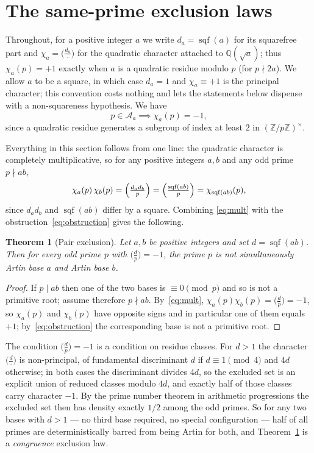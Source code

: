 \documentclass[11pt,reqno]{amsart}
\theoremstyle{plain}
\newtheorem{theorem}{Theorem}
\theoremstyle{definition}
\DeclareMathOperator{\sqf}{sqf}
\newcommand{\Acal}{\mathcal{A}}
\newcommand{\Z}{\mathbb{Z}}
\newcommand{\Q}{\mathbb{Q}}
\begin{document}
\section{The same-prime exclusion laws}
\label{sec:pairlaw}

Throughout, for a positive integer $a$ we write $d_a = \sqf(a)$
for its squarefree part and $\chi_a = \bigl(\tfrac{d_a}{\cdot}\bigr)$ for the
quadratic character attached to $\Q(\sqrt{a})$; thus $\chi_a(p) = +1$ exactly
when $a$ is a quadratic residue modulo $p$ (for $p \nmid 2a$). We allow $a$ to
be a square, in which case $d_a = 1$ and $\chi_a \equiv +1$ is the principal
character; this convention costs nothing and lets the statements below dispense
with a non-squareness hypothesis. We have
\begin{equation}
\label{eq:obstruction}
  p \in \Acal_a \implies \chi_a(p) = -1,
\end{equation}
since a quadratic residue generates a subgroup of index at least $2$ in
$(\Z/p\Z)^\times$.

Everything in this section follows from one line: the quadratic character is
completely multiplicative, so for any positive integers $a, b$ and any odd
prime $p \nmid ab$,
\begin{equation}
\label{eq:mult}
  \chi_a(p)\,\chi_b(p)
    = \Bigl(\tfrac{d_a d_b}{p}\Bigr)
    = \Bigl(\tfrac{\sqf(ab)}{p}\Bigr)
    = \chi_{\sqf(ab)}(p),
\end{equation}
since $d_a d_b$ and $\sqf(ab)$ differ by a square. Combining
\eqref{eq:mult} with the obstruction~\eqref{eq:obstruction} gives the
following.

\begin{theorem}[Pair exclusion]
\label{thm:pair}
Let $a, b$ be positive integers and set $d = \sqf(ab)$. Then for every odd
prime $p$ with $\bigl(\tfrac{d}{p}\bigr) = -1$, the prime $p$ is not
simultaneously Artin base $a$ and Artin base $b$.
\end{theorem}

\begin{proof}
If $p \mid ab$ then one of the two bases is $\equiv 0 \pmod p$ and so is not a
primitive root; assume therefore $p \nmid ab$. By~\eqref{eq:mult},
$\chi_a(p)\chi_b(p) = \bigl(\tfrac{d}{p}\bigr) = -1$, so $\chi_a(p)$ and
$\chi_b(p)$ have opposite signs and in particular one of them equals $+1$;
by~\eqref{eq:obstruction} the corresponding base is not a primitive root.
\end{proof}

The condition $\bigl(\tfrac{d}{p}\bigr) = -1$ is a condition on residue
classes. For $d > 1$ the character $\bigl(\tfrac{d}{\cdot}\bigr)$ is
non-principal, of fundamental discriminant $d$ if $d \equiv 1 \pmod 4$ and
$4d$ otherwise; in both cases the discriminant divides $4d$, so the excluded set
is an explicit union of reduced classes modulo $4d$, and exactly half of those
classes carry character $-1$. By the prime number theorem in arithmetic
progressions the excluded set then has density exactly $1/2$ among the odd
primes. So for any two bases with $d > 1$ --- no third base required, no
special configuration --- half of all primes are deterministically barred from
being Artin for both, and Theorem~\ref{thm:pair} is a \emph{congruence}
exclusion law.
\end{document}
